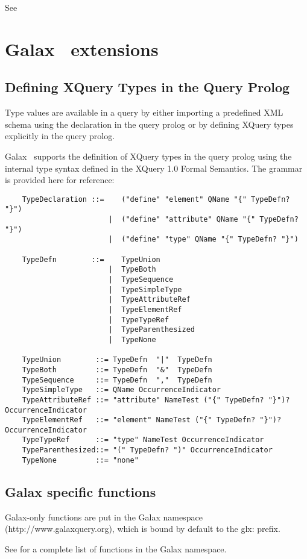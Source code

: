   See 

\section{Galax \version\ extensions}

\subsection{Defining XQuery Types in the Query Prolog}

    Type values are available in a query by either importing a
    predefined XML schema using the  declaration in the
    query prolog or by defining XQuery types explicitly in the query prolog.

    Galax \version\ supports the definition of XQuery types in the query
    prolog using the internal type syntax defined in the XQuery 1.0
    Formal Semantics.  The grammar is provided here for reference:

\begin{verbatim}
    TypeDeclaration ::=    ("define" "element" QName "{" TypeDefn? "}")
                        |  ("define" "attribute" QName "{" TypeDefn? "}")
                        |  ("define" "type" QName "{" TypeDefn? "}")

    TypeDefn        ::=    TypeUnion 
                        |  TypeBoth 
                        |  TypeSequence 
                        |  TypeSimpleType 
                        |  TypeAttributeRef 
                        |  TypeElementRef 
                        |  TypeTypeRef 
                        |  TypeParenthesized 
                        |  TypeNone

    TypeUnion        ::= TypeDefn  "|"  TypeDefn
    TypeBoth         ::= TypeDefn  "&"  TypeDefn
    TypeSequence     ::= TypeDefn  ","  TypeDefn
    TypeSimpleType   ::= QName OccurrenceIndicator
    TypeAttributeRef ::= "attribute" NameTest ("{" TypeDefn? "}")? OccurrenceIndicator
    TypeElementRef   ::= "element" NameTest ("{" TypeDefn? "}")? OccurrenceIndicator
    TypeTypeRef      ::= "type" NameTest OccurrenceIndicator
    TypeParenthesized::= "(" TypeDefn? ")" OccurrenceIndicator
    TypeNone         ::= "none"
\end{verbatim}

\subsection{Galax specific functions}

    Galax-only functions are put in the Galax namespace
    (http://www.galaxquery.org), which is bound by default to the
    glx: prefix.

    See  for a complete list of functions
    in the Galax namespace.


